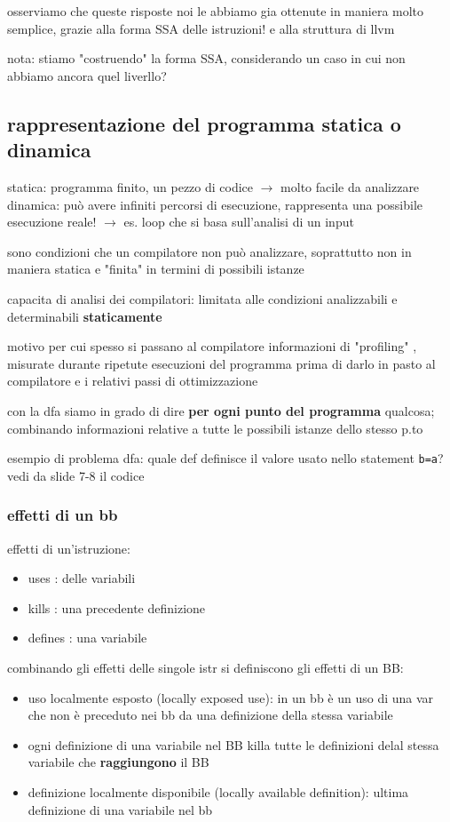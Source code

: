 osserviamo che queste risposte noi le abbiamo gia ottenute in maniera molto semplice, grazie alla forma SSA delle istruzioni! e alla struttura di llvm

nota: stiamo "costruendo" la forma SSA, considerando un caso in cui non abbiamo ancora quel liverllo?

\subsection{rappresentazione del programma statica o dinamica}

statica: programma finito, un pezzo di codice $\rightarrow$ molto facile da analizzare
dinamica: pu\`o avere infiniti percorsi di esecuzione, rappresenta una possibile esecuzione reale! $\rightarrow$ es. loop che si basa sull'analisi di un input

sono condizioni che un compilatore non pu\`o analizzare, soprattutto non in maniera statica e "finita" in termini di possibili istanze

\begin{emphasize}
    capacita di analisi dei compilatori: limitata alle condizioni analizzabili e determinabili \textbf{staticamente}

    motivo per cui spesso si passano al compilatore informazioni di "profiling" , misurate durante ripetute esecuzioni del programma prima di darlo in pasto al compilatore e i relativi passi di ottimizzazione
\end{emphasize}

con la dfa siamo in grado di dire \textbf{per ogni punto del programma} qualcosa; combinando informazioni relative a tutte le possibili istanze dello stesso p.to

esempio di problema dfa: quale def definisce il valore usato nello statement \lstinline|b=a|? vedi da slide 7-8 il codice

\subsubsection{effetti di un bb}

effetti di un'istruzione:
\begin{itemize}
  \item uses : delle variabili
  \item kills : una precedente definizione
  \item defines : una variabile
\end{itemize}
combinando gli effetti delle singole istr si definiscono gli effetti di un BB:
\begin{itemize}
  \item uso localmente esposto (locally exposed use): in un bb \`e un uso di una var che non \`e preceduto nei bb da una definizione della stessa variabile
  \item ogni definizione di una variabile nel BB killa tutte le definizioni delal stessa variabile che \textbf{raggiungono} il BB
  \item definizione localmente disponibile (locally available definition): ultima definizione di una variabile nel bb
\end{itemize}

